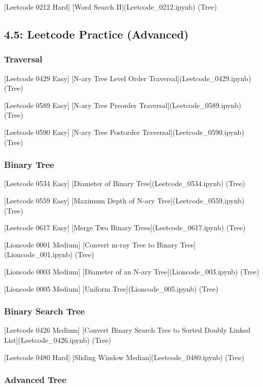 \documentclass[11pt]{article}
\begin{document}
{[}Leetcode 0212 Hard{]} {[}Word Search II{]}(Leetcode\_0212.ipynb)
(Tree)

    \subsection{4.5: Leetcode Practice
(Advanced)}\label{leetcode-practice-advanced}

    \subsubsection{Traversal}\label{traversal}

{[}Leetcode 0429 Easy{]} {[}N-ary Tree Level Order
Traversal{]}(Leetcode\_0429.ipynb) (Tree)

{[}Leetcode 0589 Easy{]} {[}N-ary Tree Preorder
Traversal{]}(Leetcode\_0589.ipynb) (Tree)

{[}Leetcode 0590 Easy{]} {[}N-ary Tree Postorder
Traversal{]}(Leetcode\_0590.ipynb) (Tree)

\subsubsection{Binary Tree}\label{binary-tree}

{[}Leetcode 0534 Easy{]} {[}Diameter of Binary
Tree{]}(Leetcode\_0534.ipynb) (Tree)

{[}Leetcode 0559 Easy{]} {[}Maximum Depth of N-ary
Tree{]}(Leetcode\_0559.ipynb) (Tree)

{[}Leetcode 0617 Easy{]} {[}Merge Two Binary
Trees{]}(Leetcode\_0617.ipynb) (Tree)

{[}Lioncode 0001 Medium{]} {[}Convert m-ray Tree to Binary
Tree{]}(Lioncode\_001.ipynb) (Tree)

{[}Lioncode 0003 Medium{]} {[}Diameter of an N-ary
Tree{]}(Lioncode\_003.ipynb) (Tree)

{[}Lioncode 0005 Medium{]} {[}Uniform Tree{]}(Lioncode\_005.ipynb)
(Tree)

\subsubsection{Binary Search Tree}\label{binary-search-tree}

{[}Leetcode 0426 Medium{]} {[}Convert Binary Search Tree to Sorted
Doubly Linked List{]}(Leetcode\_0426.ipynb) (Tree)

{[}Leetcode 0480 Hard{]} {[}Sliding Window
Median{]}(Leetcode\_0480.ipynb) (Tree)

\subsubsection{Advanced Tree}\label{advanced-tree}


    
    
    
    
\end{document}
